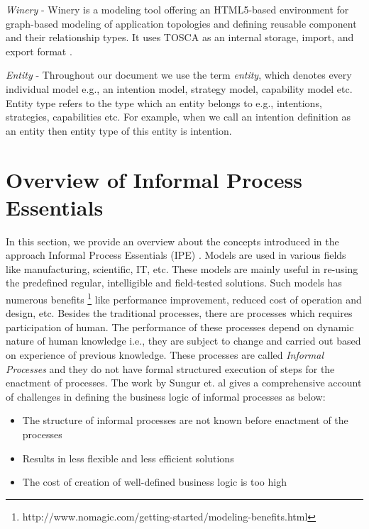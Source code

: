 \textit{Winery} - Winery is a modeling tool offering an HTML5-based environment for graph-based modeling of application topologies and defining reusable component and their relationship types. It uses TOSCA as an internal storage, import, and export format \cite{Kopp2013}. 
 
\textit{Entity} - Throughout our document we use the term \textit{entity}, which denotes every individual model e.g., an intention model, strategy model, capability model etc. Entity type refers to the type which an entity belongs to e.g., intentions, strategies, capabilities etc. For example, when we call an intention definition as an entity then entity type of this entity is intention. 

\section{Overview of Informal Process Essentials}
\label{sec:basicconcepts}
In this section, we provide an overview about the concepts introduced in the approach Informal Process Essentials (IPE) \cite{Sungur2014a}. Models are used in various fields like manufacturing, scientific, IT, etc. These models are mainly useful in re-using the predefined regular, intelligible and field-tested solutions. Such models has numerous benefits \footnote{http://www.nomagic.com/getting-started/modeling-benefits.html} like performance improvement, reduced cost of operation and design, etc. Besides the traditional processes, there are processes which requires participation of human. The performance of these processes depend on dynamic nature of human knowledge i.e., they are subject to change and carried out based on experience of previous knowledge. These processes are called \textit{Informal Processes} \cite{Sungur2014} and they do not have formal structured execution of steps for the enactment of processes. The work by Sungur et. al \cite{Sungur2014a} gives a comprehensive account of challenges in defining the business logic of informal processes as below:

\begin{itemize}
	\item The structure of informal processes are not known before enactment of the processes
	\item Results in less flexible and less efficient solutions
	\item The cost of creation of well-defined business logic is too high
\end{itemize}

